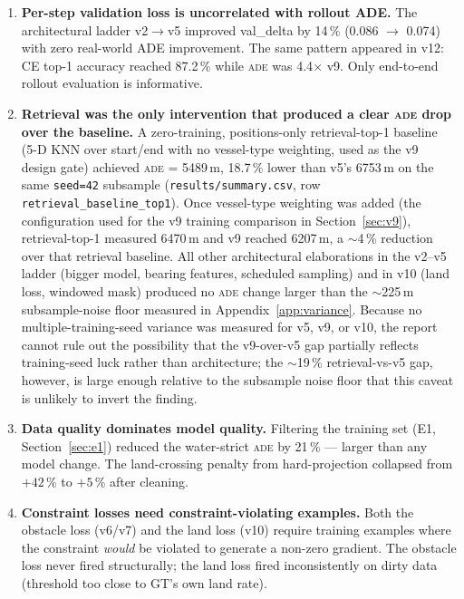 \documentclass[11pt,a4paper]{article}
\newcommand{\ade}{\textsc{ade}}
\begin{document}
\begin{enumerate}

\item \textbf{Per-step validation loss is uncorrelated with rollout ADE.}
      The architectural ladder v2$\to$v5 improved val\_delta by 14\,\% (0.086 $\to$ 0.074)
      with zero real-world ADE improvement.
      The same pattern appeared in v12: CE top-1 accuracy reached 87.2\,\% while
      \ade{} was 4.4$\times$ v9.
      Only end-to-end rollout evaluation is informative.

\item \textbf{Retrieval was the only intervention that produced a clear
      \ade{} drop over the baseline.}
      A zero-training, positions-only retrieval-top-1 baseline
      (5-D KNN over start/end with no vessel-type weighting, used as the
      v9 design gate) achieved \ade{} = 5489\,m,
      18.7\,\% lower than v5's 6753\,m on the same \texttt{seed=42} subsample
      (\texttt{results/summary.csv}, row \texttt{retrieval\_baseline\_top1}).
      Once vessel-type weighting was added (the configuration used for the v9
      training comparison in Section~\ref{sec:v9}), retrieval-top-1 measured
      6470\,m and v9 reached 6207\,m, a $\sim$4\,\% reduction over that
      retrieval baseline.
      All other architectural elaborations in the v2--v5 ladder
      (bigger model, bearing features, scheduled sampling) and in v10
      (land loss, windowed mask) produced no \ade{} change larger than the
      $\sim$225\,m subsample-noise floor measured in
      Appendix~\ref{app:variance}.
      Because no multiple-training-seed variance was measured for v5, v9, or
      v10, the report cannot rule out the possibility that the v9-over-v5 gap
      partially reflects training-seed luck rather than architecture; the
      $\sim$19\,\% retrieval-vs-v5 gap, however, is large enough relative to
      the subsample noise floor that this caveat is unlikely to invert the
      finding.

\item \textbf{Data quality dominates model quality.}
      Filtering the training set (E1, Section~\ref{sec:e1}) reduced the water-strict
      \ade{} by 21\,\% --- larger than any model change.
      The land-crossing penalty from hard-projection collapsed from $+42$\,\% to
      $+5$\,\% after cleaning.

\item \textbf{Constraint losses need constraint-violating examples.}
      Both the obstacle loss (v6/v7) and the land loss (v10) require training
      examples where the constraint \emph{would} be violated to generate
      a non-zero gradient.
      The obstacle loss never fired structurally; the land loss fired inconsistently
      on dirty data (threshold too close to GT's own land rate).


\end{enumerate}
\end{document}
